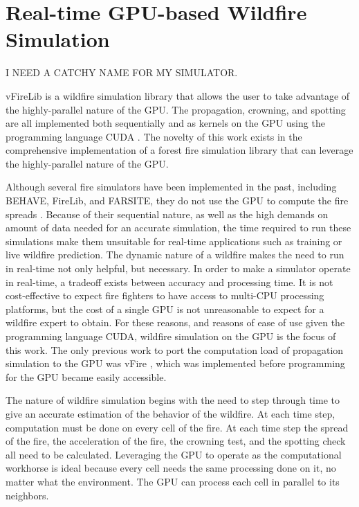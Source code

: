 \chapter{Real-time GPU-based Wildfire Simulation}
\label{chapter:gpuSim}
I NEED A CATCHY NAME FOR MY SIMULATOR. 

vFireLib is a wildfire simulation library that allows the user to take advantage of the highly-parallel nature of the GPU. The propagation, crowning, and spotting are all implemented both sequentially and as kernels on the GPU using the programming language CUDA \cite{cuda}. The novelty of this work exists in the comprehensive implementation of a forest fire simulation library that can leverage the highly-parallel nature of the GPU. 

Although several fire simulators have been implemented in the past, including BEHAVE, FireLib, and FARSITE, they do not use the GPU to compute the fire spreads \cite{fireLib}\cite{BEHAVE}\cite{FARSITE}. Because of their sequential nature, as well as the high demands on amount of data needed for an accurate simulation, the time required to run these simulations make them unsuitable for real-time applications such as training or live wildfire prediction. The dynamic nature of a wildfire makes the need to run in real-time not only helpful, but necessary. In order to make a simulator operate in real-time, a tradeoff exists between accuracy and processing time. It is not cost-effective to expect fire fighters to have access to multi-CPU processing platforms, but the cost of a single GPU is not unreasonable to expect for a wildfire expert to obtain. For these reasons, and reasons of ease of use given the programming language CUDA, wildfire simulation on the GPU is the focus of this work. The only previous work to port the computation load of propagation simulation to the GPU was vFire \cite{vFire}, which was implemented before programming for the GPU became easily accessible. 

The nature of wildfire simulation begins with the need to step through time to give an accurate estimation of the behavior of the wildfire. At each time step, computation must be done on every cell of the fire. At each time step the spread of the fire, the acceleration of the fire, the crowning test, and the spotting check all need to be calculated. Leveraging the GPU to operate as the computational workhorse is ideal because every cell needs the same processing done on it, no matter what the environment. The GPU can process each cell in parallel to its neighbors. 

